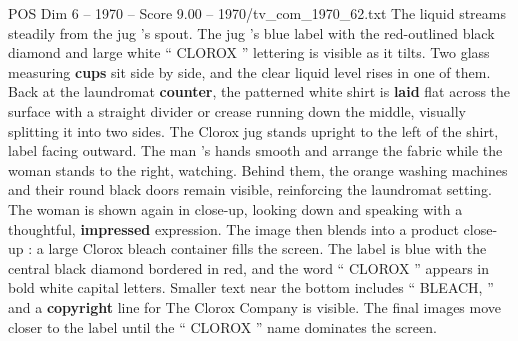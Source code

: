\begin{textsample}{POS Dim 6 – 1970 – Score 9.00 – 1970/tv\_com\_1970\_62.txt}
The liquid streams steadily from the jug ’s spout.
The jug ’s blue label with the red-outlined black diamond and large white “ CLOROX ” lettering is visible as it tilts.
Two glass measuring \textbf{cups} sit side by side, and the clear liquid level rises in one of them.
Back at the laundromat \textbf{counter}, the patterned white shirt is \textbf{laid} flat across the surface with a straight divider or crease running down the middle, visually splitting it into two sides.
The Clorox jug stands upright to the left of the shirt, label facing outward.
The man ’s hands smooth and arrange the fabric while the woman stands to the right, watching.
Behind them, the orange washing machines and their round black doors remain visible, reinforcing the laundromat setting.
The woman is shown again in close-up, looking down and speaking with a thoughtful, \textbf{impressed} expression.
The image then blends into a product close-up : a large Clorox bleach container fills the screen.
The label is blue with the central black diamond bordered in red, and the word “ CLOROX ” appears in bold white capital letters.
Smaller text near the bottom includes “ BLEACH, ” and a \textbf{copyright} line for The Clorox Company is visible.
The final images move closer to the label until the “ CLOROX ” name dominates the screen.

\end{textsample}
